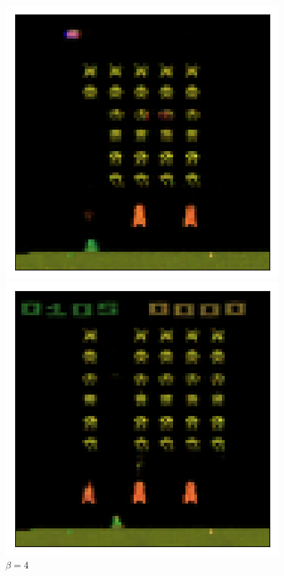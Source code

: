 \begin{figure}[h!]
\begin{multicols}{4}
    \includegraphics[scale=0.4]{figures/results/colour_separated/beta_2_sample_0_reconstructed.png}
    \caption{$\beta = 2$}
    \includegraphics[scale=0.4]{figures/results/colour_separated/beta_4_sample_0_reconstructed.png}
    \caption{$\beta = 4$}
\end{multicols}
\begin{multicols}{4}

\end{multicols}
\end{figure}
